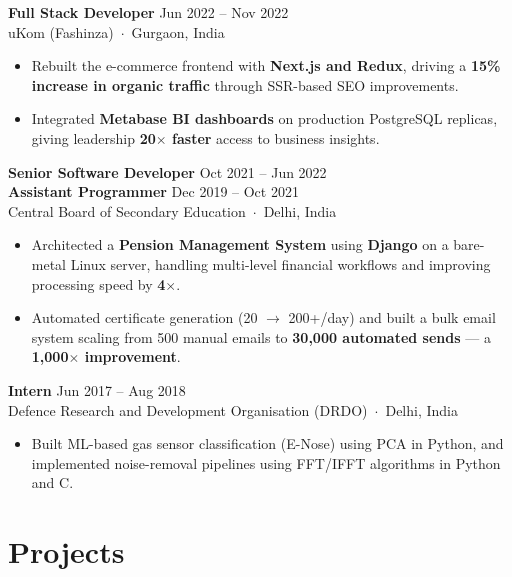 \documentclass[a4paper,11pt]{article}
\begin{document}
\medskip

\noindent\textbf{Full Stack Developer} \hfill Jun 2022 -- Nov 2022 \\
{\color{muted} uKom (Fashinza) \,$\cdot$\, Gurgaon, India}
\begin{itemize}
  \item Rebuilt the e-commerce frontend with \textbf{Next.js and Redux}, driving a \textbf{15\% increase in organic traffic} through SSR-based SEO improvements.
  \item Integrated \textbf{Metabase BI dashboards} on production PostgreSQL replicas, giving leadership \textbf{20$\times$ faster} access to business insights.
\end{itemize}

\medskip

\noindent\textbf{Senior Software Developer} \hfill Oct 2021 -- Jun 2022 \\
\textbf{Assistant Programmer} \hfill Dec 2019 -- Oct 2021 \\
{\color{muted} Central Board of Secondary Education \,$\cdot$\, Delhi, India}
\begin{itemize}
  \item Architected a \textbf{Pension Management System} using \textbf{Django} on a bare-metal Linux server, handling multi-level financial workflows and improving processing speed by \textbf{4$\times$}.
  \item Automated certificate generation (20 $\to$ 200+/day) and built a bulk email system scaling from 500 manual emails to \textbf{30,000 automated sends} --- a \textbf{1,000$\times$ improvement}.
\end{itemize}

\medskip

\noindent\textbf{Intern} \hfill Jun 2017 -- Aug 2018 \\
{\color{muted} Defence Research and Development Organisation (DRDO) \,$\cdot$\, Delhi, India}
\begin{itemize}
  \item Built ML-based gas sensor classification (E-Nose) using PCA in Python, and implemented noise-removal pipelines using FFT/IFFT algorithms in Python and C.
\end{itemize}

\section{Projects}
\end{document}
